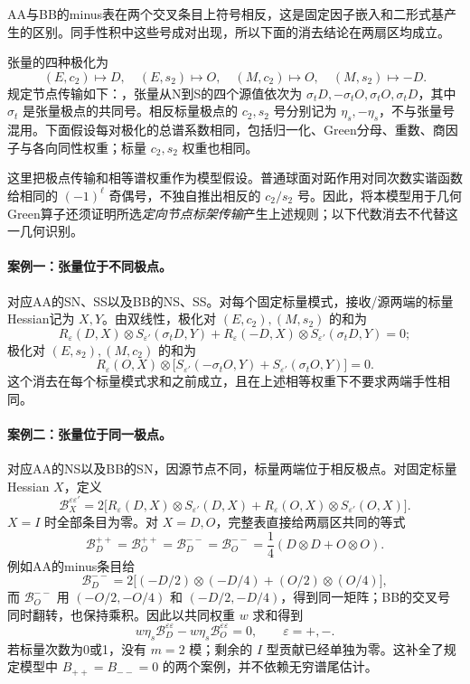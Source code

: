 \documentclass[UTF8,a4paper,11pt,fontset=fandol]{ctexart}
\numberwithin{equation}{section}
\theoremstyle{definition}
\begin{document}
AA与BB的minus表在两个交叉条目上符号相反，这是固定因子嵌入和二形式基产生的区别。同手性积中这些号成对出现，所以下面的消去结论在两扇区均成立。

张量的四种极化为
\[
(E,c_2)\mapsto D,\quad(E,s_2)\mapsto O,\quad
(M,c_2)\mapsto O,\quad(M,s_2)\mapsto-D.
\]
规定节点传输如下：，张量从N到S的四个源值依次为
$\sigma_tD,-\sigma_tO,\sigma_tO,\sigma_tD$，其中 $\sigma_t$ 是张量极点的共同号。相反标量极点的 $c_2,s_2$ 号分别记为 $\eta_s,-\eta_s$，不与张量号混用。下面假设每对极化的总谱系数相同，包括归一化、Green分母、重数、商因子与各向同性权重；标量 $c_2,s_2$ 权重也相同。

这里把极点传输和相等谱权重作为模型假设。普通球面对跖作用对同次数实谐函数给相同的 $(-1)^\ell$ 奇偶号，不独自推出相反的 $c_2/s_2$ 号。因此，将本模型用于几何Green算子还须证明所选\emph{定向节点标架传输}产生上述规则；以下代数消去不代替这一几何识别。

\paragraph{案例一：张量位于不同极点。}
对应AA的SN、SS以及BB的NS、SS。对每个固定标量模式，接收/源两端的标量Hessian记为 $X,Y$。由双线性，极化对 $(E,c_2),(M,s_2)$ 的和为
\[
R_\varepsilon(D,X)\otimes S_{\varepsilon'}(\sigma_tD,Y)
+R_\varepsilon(-D,X)\otimes S_{\varepsilon'}(\sigma_tD,Y)=0;
\]
极化对 $(E,s_2),(M,c_2)$ 的和为
\[
R_\varepsilon(O,X)\otimes
\bigl[S_{\varepsilon'}(-\sigma_tO,Y)+S_{\varepsilon'}(\sigma_tO,Y)\bigr]=0.
\]
这个消去在每个标量模式求和之前成立，且在上述相等权重下不要求两端手性相同。

\paragraph{案例二：张量位于同一极点。}
对应AA的NS以及BB的SN，因源节点不同，标量两端位于相反极点。对固定标量Hessian $X$，定义
\[
\mathcal B_X^{\varepsilon\varepsilon'}=
2\bigl[R_\varepsilon(D,X)\otimes S_{\varepsilon'}(D,X)
+R_\varepsilon(O,X)\otimes S_{\varepsilon'}(O,X)\bigr].
\]
$X=I$ 时全部条目为零。对 $X=D,O$，完整表直接给两扇区共同的等式
\begin{equation}\label{eq:samechiralityblocks}
\mathcal B_D^{++}=\mathcal B_O^{++}
=\mathcal B_D^{--}=\mathcal B_O^{--}
=\frac14(D\otimes D+O\otimes O).
\end{equation}
例如AA的minus条目给
\[
\mathcal B_D^{--}=2\bigl[(-D/2)\otimes(-D/4)
+(O/2)\otimes(O/4)\bigr],
\]
而 $\mathcal B_O^{--}$ 用 $(-O/2,-O/4)$ 和 $(-D/2,-D/4)$，得到同一矩阵；BB的交叉号同时翻转，也保持乘积。因此以共同权重 $w$ 求和得到
\[
w\eta_s\mathcal B_D^{\varepsilon\varepsilon}
-w\eta_s\mathcal B_O^{\varepsilon\varepsilon}=0,
\qquad\varepsilon=+,-.
\]
若标量次数为0或1，没有 $m=2$ 模；剩余的 $I$ 型贡献已经单独为零。这补全了规定模型中 $B_{++}=B_{--}=0$ 的两个案例，并不依赖无穷谱尾估计。
\end{document}
